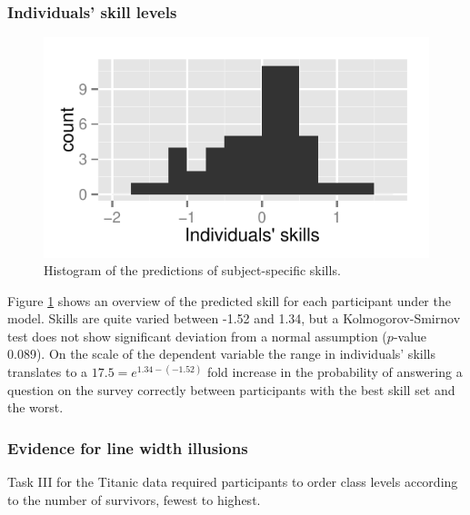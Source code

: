 \documentclass[journal]{vgtc}\usepackage{graphicx, color}
\begin{document}
\subsubsection*{Individuals' skill levels}
\begin{figure}
\centering \includegraphics[width=.7\linewidth]{hist-skills}
\caption{\label{skills}Histogram of the predictions of subject-specific skills. }
\vspace{-0.2in}
\end{figure}  
Figure \ref{skills} shows an overview of the predicted skill for each participant under the model. Skills are quite varied between  -1.52 and  1.34, but
a Kolmogorov-Smirnov test  does not show significant deviation from a normal assumption ($p$-value 0.089).
On the scale of the dependent variable the range in individuals' skills translates to a $17.5 = e^{1.34 - (-1.52)}$ fold increase in the probability of answering a question on the survey correctly between participants with the best skill set and the worst.


\subsubsection*{Evidence for line width illusions}

Task III for the Titanic data required participants to order  class levels  according to the number of survivors, fewest to highest. 

\end{document}
